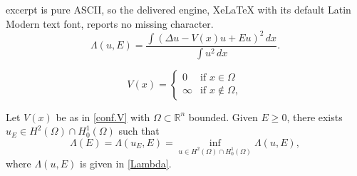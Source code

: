 \documentclass[10pt,a4paper]{amsart}
\newcommand{\R}{\mathbb{R}}
\begin{document}
excerpt is pure ASCII, so the delivered engine, XeLaTeX with its default Latin Modern text font, reports no missing character.
\begin{equation}\label{Lambda}
\Lambda(u, E) = \frac{\int (\Delta u - V(x) u + Eu)^2\, dx}{\int u^2\, dx}.
\end{equation}

\begin{equation}\label{conf.V}
V(x) = \begin{cases}
0 & \text{if } x\in \Omega\\
\infty & \text{if } x\not\in \Omega,
\end{cases}
\end{equation}

\begin{teo}\label{teo.min}
Let $V(x)$ be as in \eqref{conf.V} with $\Omega\subset \R^n$ bounded. Given $E\ge 0$, there exists $u_E\in H^2(\Omega)\cap H^1_0(\Omega)$ such that
$$
\Lambda(E) = \Lambda(u_E, E) = \inf_{u\in H^2(\Omega)\cap H^1_0(\Omega)}\Lambda(u, E),
$$
where $\Lambda(u, E)$ is given in \eqref{Lambda}.
\end{teo}
\end{document}
